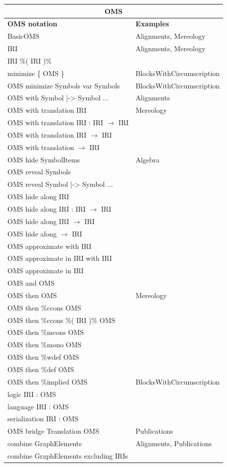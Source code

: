 \documentclass[10pt,%
\ifpretendfinal
final%
\else
draft%
\fi,
]{scrreprt}
\begin{document}
\begin{tabular}{|l|l|}\hline
\multicolumn{2}{|c|}{\textbf{OMS}}\\\hline
\textbf{OMS notation} & \textbf{Examples} \\\hline
BasicOMS  & Alignments, Mereology \\\hline
IRI  & Alignments, Mereology \\\hline
IRI \%( IRI )\%  &  \\\hline
minimize \{ OMS \}  & BlocksWithCircumscription \\\hline
OMS minimize Symbols var Symbols  & BlocksWithCircumscription \\\hline
OMS with Symbol |-> Symbol ...  & Alignments \\\hline
OMS with translation IRI  & Mereology \\\hline
OMS with translation IRI : IRI $\to$ IRI  &  \\\hline
OMS with translation IRI $\to$ IRI  &  \\\hline
OMS with translation $\to$ IRI  &  \\\hline
OMS hide SymbolItems  &  Algebra \\\hline
OMS reveal Symbols  &  \\\hline
OMS reveal Symbol |-> Symbol ...  &  \\\hline
OMS hide along IRI  &  \\\hline
OMS hide along IRI : IRI $\to$ IRI  &  \\\hline
OMS hide along IRI $\to$ IRI  &  \\\hline
OMS hide along $\to$ IRI  &  \\\hline
OMS approximate with IRI   &  \\\hline
OMS approximate in IRI with IRI   &  \\\hline
OMS approximate in IRI  &  \\\hline
OMS and OMS   &  \\\hline
OMS then OMS  & Mereology \\\hline
OMS then \%ccons OMS  &  \\\hline
OMS then \%ccons \%( IRI )\% OMS  &  \\\hline
OMS then \%mcons OMS  &  \\\hline
OMS then \%mono OMS  &  \\\hline
OMS then \%wdef OMS  &  \\\hline
OMS then \%def OMS  &  \\\hline
OMS then \%implied OMS  &  BlocksWithCircumscription \\\hline
logic IRI : OMS  &  \\\hline
language IRI : OMS  &  \\\hline
serialization IRI : OMS  &  \\\hline
OMS bridge Translation OMS  & Publications \\\hline
combine GraphElements  & Alignments, Publications \\\hline
combine GraphElements excluding IRIs  &  \\\hline
\end{tabular}
\end{document}
